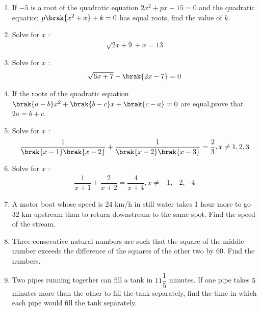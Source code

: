 \begin{enumerate}
\item If $-5$ is a root of the quadratic equation $2x^2+px-15=0$ and the quadratic equation $p\brak{x^2+x}+k=0 $ has equal roots, find the value of $k$. \\
\item Solve for $x$ : 
\begin{align*}\sqrt{2x+9} + x = 13\end{align*}
\item Solve for $x$ :
\begin{align*}\sqrt{6x+7}-\brak{2x-7}= 0\end{align*}
\item If the roots of the quadratic equation $\brak{a-b}x^2+\brak{b-c}x+\brak{c-a}=0$ are equal,prove that $2a=b+c$.\\
\item  Solve for $ x$ :  \begin{align*} \dfrac{1}{\brak{x-1}\brak{x-2}}  +  \dfrac{1}{\brak{x-2}\brak{x-3}}  =  \dfrac{2}{3} , x \neq 1,2,3\end{align*}
\item  Solve for $ x$ :  \begin{align*} \dfrac{1}{x+1}  + \dfrac{2}{x+2}  = \dfrac{4}{x+4} , x \neq -1,-2,-4 \end{align*} 
\item A motor boat whose speed is $24$ km/h in still water takes 1 hour more to go $32$ km upstream than to return downstream to the same spot. Find the speed of the stream.\\
\item Three consecutive natural numbers are such that the square of the middle number exceeds the difference of the squares of the other two by $60$. Find the numbers.\\
\item Two pipes running together can fill a tank in $11\dfrac{1}{5}$ minutes. If one pipe takes $5$ minutes more than the other to fill the tank separately, find the time in which each pipe would fill the tank separately.
\end{enumerate}
